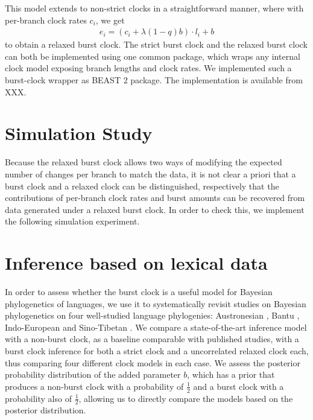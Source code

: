 \documentclass[a4paper,12pt]{scrartcl}
\begin{document}
This model extends to non-strict clocks in a straightforward manner, where with per-branch clock rates $c_i$, we get
\begin{align}
  e_i = (c_i + \lambda (1-q) b) \cdot l_i + b
  \label{eq:relaxed}
\end{align}
to obtain a relaxed burst clock.
The strict burst clock and the relaxed burst clock can both be implemented using one common package, which wraps any internal clock model exposing branch lengths and clock rates.
We implemented such a burst-clock wrapper as BEAST 2 package.
The implementation is available from XXX.

\section{Simulation Study}
\label{s:simulation}
Because the relaxed burst clock allows two ways of modifying the expected number
of changes per branch to match the data, it is not clear a priori that a burst
clock and a relaxed clock can be distinguished, respectively that the
contributions of per-branch clock rates and burst amounts can be recovered from
data generated under a relaxed burst clock.
In order to check this, we implement the following simulation experiment.

\section{Inference based on lexical data}
\label{s:lexical}

In order to assess whether the burst clock is a useful model for Bayesian
phylogenetics of languages, we use it to systematically revisit studies on Bayesian phylogenetics
on four well-studied language phylogenies:
Austronesian
\parencite{gray2009language,greenhill2017evolutionary,greenhill2018population},
Bantu
\parencite{grollemund2015bantu,greenhill2018population,currie2013cultural},
Indo-European
\parencite{bouckaert2012mapping,chang2015ancestryconstrained,gray2003language,holm2017steppe,rama2018three,willems2016using}
and
Sino-Tibetan \parencite{sagart2019dated,zhang2019phylogenetic}.
We compare
a state-of-the-art inference model with a non-burst clock, as a baseline
comparable with published studies, with a burst clock inference
for both a strict clock and a uncorrelated relaxed clock each, thus
comparing four different clock models in each case.
We assess the posterior probability distribution of the added
parameter $b$, which has a prior that produces a non-burst clock with a
probability of $\frac{1}{2}$ and a burst clock with a probability also of
$\frac{1}{2}$, allowing us to directly compare the models based on the posterior
distribution.
\end{document}
